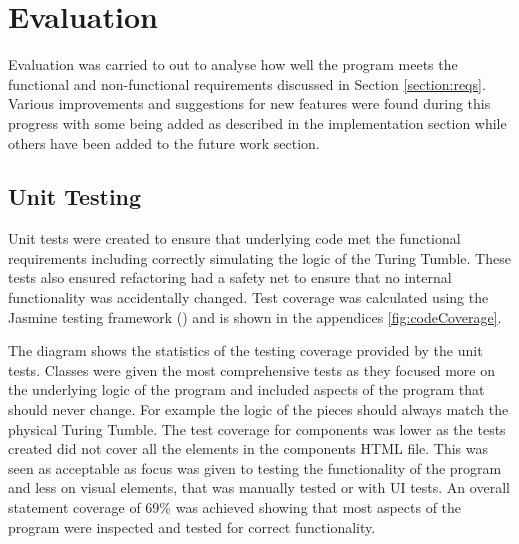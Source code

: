 \documentclass{l4proj}
\begin{document}
\chapter{Evaluation}
\label{section:evaluation}
Evaluation was carried to out to analyse how well the program meets the functional and non-functional requirements discussed in Section \ref{section:reqs}. Various improvements and suggestions for new features were found during this progress with some being added as described in the implementation section while others have been added to the future work section. 

\section{Unit Testing}
Unit tests were created to ensure that underlying code met the functional requirements including correctly simulating the logic of the Turing Tumble. These tests also ensured refactoring had a safety net to ensure that no internal functionality was accidentally changed. Test coverage was calculated using the Jasmine testing framework (\cite{jasmine}) and is shown in the appendices \ref{fig:codeCoverage}. 

The diagram shows the statistics of the testing coverage provided by the unit tests. Classes were given the most comprehensive tests as they focused more on the underlying logic of the program and included aspects of the program that should never change. For example the logic of the pieces should always match the physical Turing Tumble. The test coverage for components was lower as the tests created did not cover all the elements in the components HTML file. This was seen as acceptable as focus was given to testing the functionality of the program and less on visual elements, that was manually tested or with UI tests. An overall statement coverage of 69\% was achieved showing that most aspects of the program were inspected and tested for correct functionality.
\end{document}
